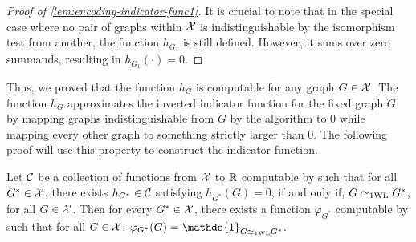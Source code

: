 \begin{proof}[Proof of \cref{lem:encoding-indicator-func1}]
    It is crucial to note that in the special case where no pair of graphs within $\mathcal{X}$ is indistinguishable by the \wl isomorphism test from another, the function $h_{G_1}$ is still defined. However, it sums over zero summands, resulting in $h_{G_1}(\cdot) = 0$.
\end{proof}

Thus, we proved that the function $h_{G}$ is \wlnn computable for any graph $G \in \mathcal{X}$. The function $h_{G}$ approximates the inverted indicator function for the fixed graph $G$ by mapping graphs indistinguishable from $G$ by the \wl algorithm to $0$ while mapping every other graph to something strictly larger than $0$. The following proof will use this property to construct the indicator function.

\begin{lemma}\label{lem:encoding-indicator-func2}
    Let $\mathcal{C}$ be a collection of functions from $\mathcal{X}$ to $\mathbb{R}$ computable by \wlnn such that for all $G^* \in \mathcal{X}$, there exists $h_{G^*} \in \mathcal{C}$ satisfying $h_{G^*}(G) = 0 $, if and only if, $G \simeq_{\text{1WL}} G^*$, for all $G \in \mathcal{X}$. Then for every $G^* \in \mathcal{X}$, there exists a function $\varphi_{G^*} $ computable by \wlnn such that for all $G \in \mathcal{X}$: $\varphi_{G^*}(G) = \mathds{1}_{G \wliso G^*}$.
\end{lemma}

